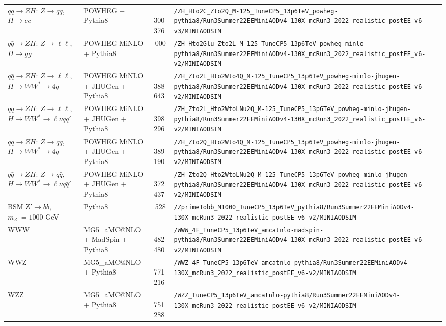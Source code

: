 \begin{landscape}
\begin{longtable}{@{}>{\raggedright\arraybackslash}p{3.2cm}>{\raggedright\arraybackslash}p{3.6cm}>{\raggedleft\arraybackslash}p{1.6cm}>{\raggedright\arraybackslash}p{13.5cm}@{}}
$q\bar q\to ZH$: $Z\to q\bar q$, $H\to c\bar c$ & POWHEG + Pythia8 & 15\,300\,376 & \nolinkurl{/ZH_Hto2C_Zto2Q_M-125_TuneCP5_13p6TeV_powheg-pythia8/Run3Summer22EEMiniAODv4-130X_mcRun3_2022_realistic_postEE_v6-v3/MINIAODSIM} \\
$q\bar q\to ZH$: $Z\to \ell\ell$, $H\to gg$ & POWHEG MiNLO + Pythia8 & 250\,000 & \nolinkurl{/ZH_Hto2Glu_Zto2L_M-125_TuneCP5_13p6TeV_powheg-minlo-pythia8/Run3Summer22EEMiniAODv4-130X_mcRun3_2022_realistic_postEE_v6-v2/MINIAODSIM} \\
$q\bar q\to ZH$: $Z\to \ell\ell$, $H\to WW^*\to 4q$ & POWHEG MiNLO + JHUGen + Pythia8 & 1\,388\,643 & \nolinkurl{/ZH_Zto2L_Hto2Wto4Q_M-125_TuneCP5_13p6TeV_powheg-minlo-jhugen-pythia8/Run3Summer22EEMiniAODv4-130X_mcRun3_2022_realistic_postEE_v6-v2/MINIAODSIM} \\
$q\bar q\to ZH$: $Z\to \ell\ell$, $H\to WW^*\to\ell\nu q\bar q'$ & POWHEG MiNLO + JHUGen + Pythia8 & 1\,398\,296 & \nolinkurl{/ZH_Zto2L_Hto2WtoLNu2Q_M-125_TuneCP5_13p6TeV_powheg-minlo-jhugen-pythia8/Run3Summer22EEMiniAODv4-130X_mcRun3_2022_realistic_postEE_v6-v2/MINIAODSIM} \\
$q\bar q\to ZH$: $Z\to q\bar q$, $H\to WW^*\to 4q$ & POWHEG MiNLO + JHUGen + Pythia8 & 1\,389\,190 & \nolinkurl{/ZH_Zto2Q_Hto2Wto4Q_M-125_TuneCP5_13p6TeV_powheg-minlo-jhugen-pythia8/Run3Summer22EEMiniAODv4-130X_mcRun3_2022_realistic_postEE_v6-v2/MINIAODSIM} \\
$q\bar q\to ZH$: $Z\to q\bar q$, $H\to WW^*\to\ell\nu q\bar q'$ & POWHEG MiNLO + JHUGen + Pythia8 & 1\,372\,437 & \nolinkurl{/ZH_Zto2Q_Hto2WtoLNu2Q_M-125_TuneCP5_13p6TeV_powheg-minlo-jhugen-pythia8/Run3Summer22EEMiniAODv4-130X_mcRun3_2022_realistic_postEE_v6-v2/MINIAODSIM} \\
BSM Z$'\to b\bar b$, $m_{Z'}=1000$ GeV & Pythia8 & 288\,528 & \nolinkurl{/ZprimeTobb_M1000_TuneCP5_13p6TeV_pythia8/Run3Summer22EEMiniAODv4-130X_mcRun3_2022_realistic_postEE_v6-v2/MINIAODSIM} \\
WWW & MG5\_aMC@NLO + MadSpin + Pythia8 & 1\,482\,480 & \nolinkurl{/WWW_4F_TuneCP5_13p6TeV_amcatnlo-madspin-pythia8/Run3Summer22EEMiniAODv4-130X_mcRun3_2022_realistic_postEE_v6-v2/MINIAODSIM} \\
WWZ & MG5\_aMC@NLO + Pythia8 & 5\,771\,216 & \nolinkurl{/WWZ_4F_TuneCP5_13p6TeV_amcatnlo-pythia8/Run3Summer22EEMiniAODv4-130X_mcRun3_2022_realistic_postEE_v6-v2/MINIAODSIM} \\
WZZ & MG5\_aMC@NLO + Pythia8 & 5\,751\,288 & \nolinkurl{/WZZ_TuneCP5_13p6TeV_amcatnlo-pythia8/Run3Summer22EEMiniAODv4-130X_mcRun3_2022_realistic_postEE_v6-v2/MINIAODSIM} \\

\end{longtable}
\end{landscape}

